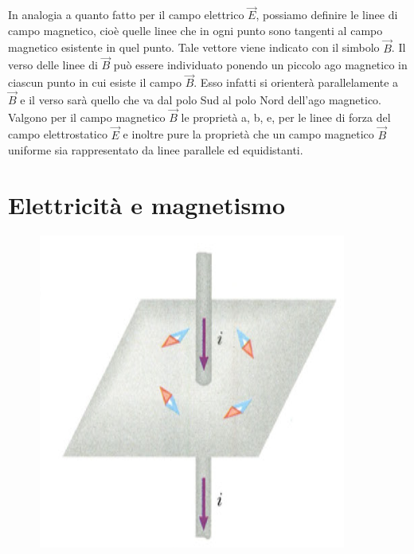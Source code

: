 \documentclass[class=book, crop=false, oneside, 12pt]{standalone}
\begin{document}
In analogia a quanto fatto per il campo elettrico \(\overrightarrow{E}\), possiamo definire le linee di campo magnetico, cioè quelle linee che in ogni punto sono tangenti al campo magnetico esistente in quel punto. 
Tale vettore viene indicato con il simbolo \(\overrightarrow{B}\). 
Il verso delle linee di \(\overrightarrow{B}\) può essere individuato ponendo un piccolo ago magnetico in ciascun punto in cui esiste il campo \(\overrightarrow{B}\). 
Esso infatti si orienterà parallelamente a \(\overrightarrow{B}\) e il verso sarà quello che va dal polo Sud al polo Nord dell'ago magnetico. 
Valgono per il campo magnetico \(\overrightarrow{B}\) le proprietà a, b, e, per le linee di forza del campo elettrostatico \(\overrightarrow{E}\) e inoltre pure la proprietà che un campo magnetico \(\overrightarrow{B}\) uniforme sia rappresentato da linee parallele ed equidistanti. 

\section{Elettricità e magnetismo}

\begin{figure}[h]
    \includegraphics[scale=0.4]{corrente_campo.png}
    \centering
    \caption{}
\end{figure}
\end{document}
